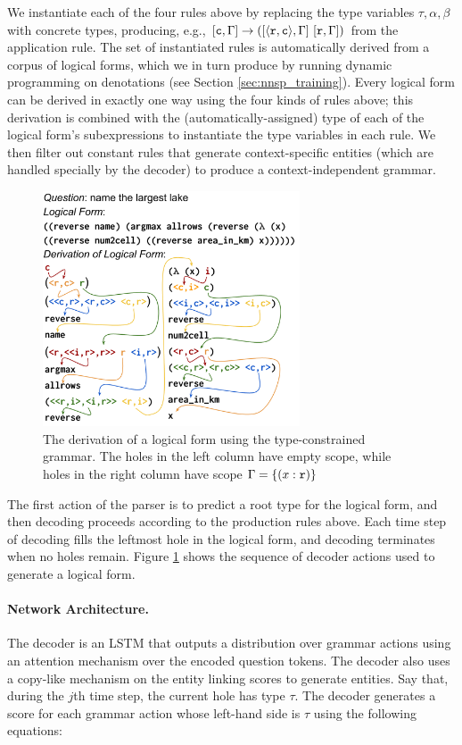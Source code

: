 We instantiate each of the four rules above by replacing the type variables 
$\tau, \alpha,\beta$ with concrete types, producing, e.g., $[\mathtt{c},\Gamma] 
\rightarrow ([\mathtt{\langle \mathtt{r},\mathtt{c} \rangle},\Gamma]~[\mathtt{r},\Gamma])$ from the application 
rule.
The set of instantiated rules is automatically derived from a corpus of logical 
forms, which we in turn produce by running dynamic programming on denotations 
(see Section \ref{sec:nnsp_training}).
Every logical form can be derived in exactly one way using the four kinds of 
rules above; this derivation is combined with the (automatically-assigned) type 
of each of the logical form's subexpressions to instantiate the type variables 
in each rule.
We then filter out constant rules that generate context-specific entities 
(which are 
handled specially by the decoder) to produce a 
context-independent grammar.

\begin{figure}
\centering
\includegraphics[width=3in]{figures/nnsp_example_derivation.png}
\caption{The derivation of a logical form using the  type-constrained grammar. 
The holes in the left column have 
empty scope, while holes in the right column have scope $\Gamma = \{(x : 
\mathtt{r})\}$}
\label{fig:grammar_derivation}
\end{figure}

The first action of the parser is to predict a root type for the logical form, 
and then decoding proceeds according to the production rules above.
Each time step of decoding fills the leftmost hole in the logical form, and 
decoding terminates when no holes remain.
Figure \ref{fig:grammar_derivation} shows the sequence of decoder actions used 
to generate a logical form.

\paragraph{Network Architecture.} The decoder is an LSTM that outputs a 
distribution over grammar actions using an attention mechanism over the encoded 
question tokens. The decoder also uses a copy-like mechanism on the entity 
linking scores to generate entities.
Say that, during the $j$th time step, the current hole has type $\tau$. The 
decoder generates a score for each grammar action whose left-hand side is 
$\tau$ using the following equations:

